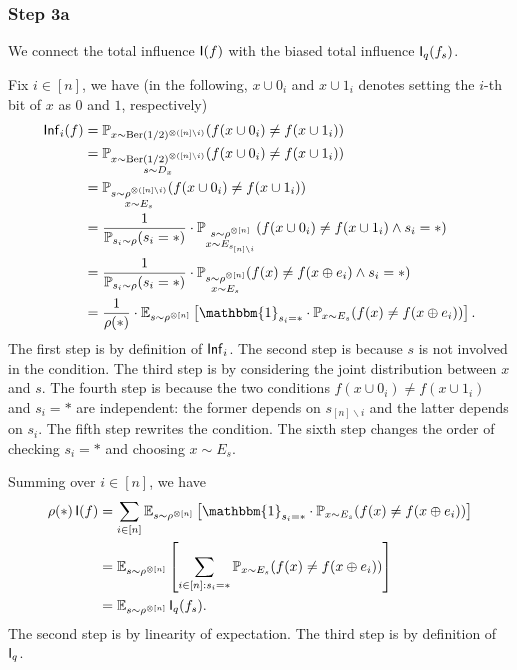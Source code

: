 \subsubsection{Step 3a}
We connect the total influence $\operatorname{\mathsf{I}}(f)$ with the biased total influence $\operatorname{\mathsf{I}}_q(f_s)$.

Fix $i\in [n]$, we have (in the following, $x \cup 0_i$ and $x \cup 1_i$ denotes setting the $i$-th bit of $x$ as $0$ and $1$, respectively)
\begin{align*}
  \Inf_i(f) &= \bP_{x\sim \Ber(1/2)^{\otimes ([n]\backslash i)}} ( f(x \cup 0_i) \ne f(x \cup 1_i)) \\
  &= \bP_{\substack{x\sim \Ber(1/2)^{\otimes ([n]\backslash i)}\\ s\sim D_x }} ( f(x \cup 0_i) \ne f(x \cup 1_i)) \\
  &= \bP_{\substack{s\sim \rho^{\otimes ([n]\backslash i)}\\ x\sim E_s }} ( f(x \cup 0_i) \ne f(x \cup 1_i)) \\
  &= \frac{1}{\bP_{s_i\sim \rho}(s_i=*)} \cdot \bP_{\substack{s\sim \rho^{\otimes [n]}\\ x\sim E_{s_{[n]\backslash i}} }} ( f(x \cup 0_i) \ne f(x \cup 1_i) \land s_i=*) \\
  &= \frac{1}{\bP_{s_i\sim \rho}(s_i=*)} \cdot \bP_{\substack{s\sim \rho^{\otimes [n]}\\ x\sim E_s }} ( f(x) \ne f(x \oplus e_i) \land s_i=*)\\
  &= \frac 1{\rho(*)} \cdot \bE_{s\sim \rho^{\otimes [n]}} \left[\mathbbm{1}_{s_i=*} \cdot \bP_{x\sim E_s} (f(x)\ne f(x \oplus e_i)) \right].
\end{align*}
The first step is by definition of $\operatorname{\mathsf{Inf}}_i$.
The second step is because $s$ is not involved in the condition.
The third step is by considering the joint distribution between $x$ and $s$.
The fourth step is because the two conditions $f(x \cup 0_i) \ne f(x \cup 1_i)$ and $s_i=*$ are independent: the former depends on $s_{[n]\backslash i}$ and the latter depends on $s_i$.
The fifth step rewrites the condition. %
The sixth step changes the order of checking $s_i=*$ and choosing $x\sim E_s$.

Summing over $i\in [n]$, we have
\begin{align*}
  \rho(*) \I(f) &= \sum_{i\in [n]} \bE_{s\sim \rho^{\otimes [n]}} \left[\mathbbm{1}_{s_i=*} \cdot \bP_{x\sim E_s} (f(x)\ne f(x \oplus e_i)) \right] \\
  &= \bE_{s\sim \rho^{\otimes [n]}} \left[\sum_{i\in [n]: s_i=*} \bP_{x\sim E_s} (f(x)\ne f(x \oplus e_i)) \right] \\
  &= \bE_{s\sim \rho^{\otimes [n]}} \I_q(f_s).
\end{align*}
The second step is by linearity of expectation.
The third step is by definition of $\operatorname{\mathsf{I}}_q$.

